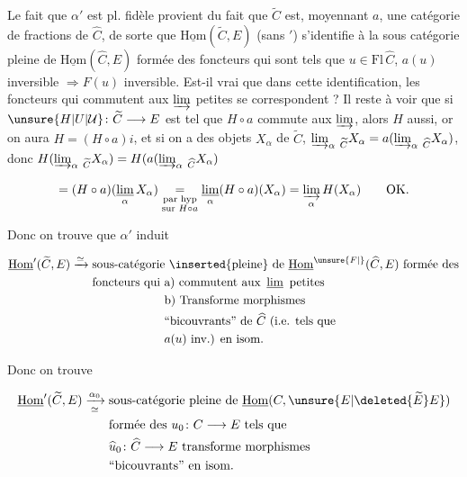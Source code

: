 Le fait que $\alpha'$ est pl. fidèle provient du fait que $\widetilde C$ est, moyennant $a$, une catégorie de fractions de $\widehat C$, de sorte que $\underline{\mathrm{Hom}}(\widetilde C,E)$ (sans $'$)  s'identifie à la sous catégorie pleine de $\underline{\mathrm{Hom}}(\widehat C,E)$ formée des foncteurs  qui sont tels que  $u\in\mathrm{Fl}\,\widehat C$, $a(u)$ inversible $\Longrightarrow F(u)$ inversible. Est-il vrai
que dans cette identification, les foncteurs qui commutent aux $\varinjlim$ petites se correspondent ? Il reste à voir que si $\unsure{H|U|\mathcal U}\colon\widetilde C\longrightarrow E$ est tel que $H\circ a$ commute aux $\varinjlim$, alors
$H$ aussi, or on aura $H=(H\circ a)i$, et si on a des objets $X_\alpha$ de $\widetilde C$, $\varinjlim_\alpha\,{}_{\widetilde C}X_\alpha=a(\varinjlim_\alpha\,{}_{\widehat C}X_\alpha)$, donc $H(\varinjlim_\alpha\,{}_{\widetilde C}X_\alpha)=H(a(\varinjlim_\alpha\,{}_{\widehat C}X_\alpha)$

\[
=(H\circ a)(\mathop{\underline{\lim}}_\alpha X_\alpha)\underset{\substack{\text{par hyp}\\\text{sur }H\circ a}}{=}\mathop{\underline{\lim}}_\alpha(H\circ a)(X_\alpha)=\varinjlim_\alpha H(X_\alpha)\qquad\text{OK.}
\]

Donc on trouve que $\alpha'$ induit

\[
\begin{aligned}
\underline{\mathrm{Hom}}'(\widetilde C,E)\xrightarrow{\simeq}{}&
\text{sous-catégorie \inserted{pleine} de }\underline{\mathrm{Hom}}^{\unsure{F|{}}}(\widehat C,E)\text{ formée des}\\
&\text{foncteurs qui a) commutent aux }\mathop{\underline{\lim}}\text{ petites}\\
&\hphantom{\text{foncteurs qui }}\text{b) Transforme morphismes}\\
&\hphantom{\text{foncteurs qui }}\text{``bicouvrants'' de }\widehat C\text{ (i.e. tels que}\\
&\hphantom{\text{foncteurs qui }}a(u)\text{ inv.) en isom.}
\end{aligned}
\]

Donc on trouve

\[
\begin{aligned}
\underline{\mathrm{Hom}}'(\widetilde C,E)\xrightarrow[\simeq]{\alpha_0}{}&
\text{sous-catégorie pleine de }\underline{\mathrm{Hom}}(C,\unsure{E|\deleted{\widetilde E}E})\\
&\text{formée des }u_0\colon C\longrightarrow E\text{ tels que}\\
&\widehat u_0\colon\widehat C\longrightarrow E\text{ transforme morphismes}\\
&\text{``bicouvrants'' en isom.}
\end{aligned}
\]


